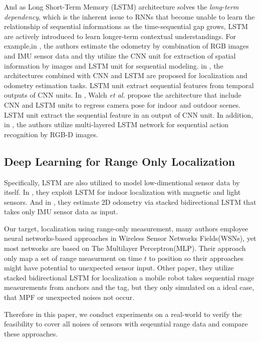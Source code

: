 \documentclass[letterpaper, 10 pt, conference]{ieeeconf}  %
\begin{document}
And as Long Short-Term Memory (LSTM) architecture solves the \textit{long-term dependency}, which is the inherent issue to RNNs that become unable to learn the relationship of sequential informations as the time-sequential gap grows\cite{hochreiter1997long}, LSTM are actively introduced to learn longer-term contextual understandings. For example,in \cite{clark2017vinet}, the authors estimate the odometry by combination of RGB images and IMU sensor data and thy utilize the CNN unit for extraction of spatial information by images and LSTM unit for sequential modeling. in \cite{patel2018contextualnet, wang2017deepvo}, the architectures combined with CNN and LSTM are proposed for localization and odometry estimation tasks. LSTM unit extract sequential features from temporal outputs of CNN units. In \cite{walch2017image}, Walch \textit{et al.} propose the architecture that include CNN and LSTM units to regress camera pose for indoor and outdoor scenes. LSTM unit extract the sequential feature in an output of CNN unit. In addition, in \cite{song2017end}, the authors utilize multi-layered LSTM network for sequential action recognition by RGB-D images.


\subsection{Deep Learning for Range Only Localization}

Specifically, LSTM are also utilized to model low-dimentional sensor data by itself. In \cite{wang2018deepml}, they exploit LSTM for indoor localization with magnetic and light sensors. And in \cite{chen2018ionet}, they estimate 2D odometry via stacked bidirectional LSTM that takes only IMU sensor data as input. 

Our target, localization using range-only measurement, many authors employee neural networks-based approaches in Wireless Sensor Networks Fields(WSNs)\cite{rahman2009localization, abdelhadi2013efficient, kumar2016localization}, yet most networks are based on The Multilayer Perceptron(MLP). Their approach only map a set of range measurment on time $t$ to position so their approaches might have potential to unexpected sensor input. Other paper\cite{lim2018effective}, they utilize stacked bidirectional LSTM for localization a mobile robot takes sequential rnage measurements from anchors and the tag, but they only simulated on a ideal case, that MPF or unexpected noises not occur.

Therefore in this paper, we conduct experiments on a real-world to verify the feasibility to cover all noises of sensors with seqeuntial range data and compare these approaches.
\end{document}
